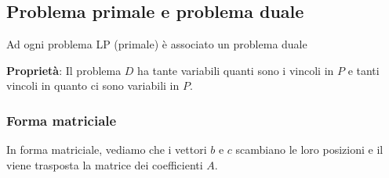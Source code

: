 \documentclass[12pt,a4paper]{article}
\begin{document}
\subsection{Problema primale e problema duale}
Ad ogni problema LP (primale) è associato un problema duale
\SmallSep \noindent
\begin{Parallel}{0.45 \textwidth}{0.45 \textwidth}
\end{Parallel}

\noindent
\textbf{Proprietà}: Il problema $D$ ha tante variabili quanti sono i vincoli in $P$ e tanti vincoli in quanto ci sono variabili in $P$.

\subsubsection{Forma matriciale}
In forma matriciale, vediamo che i vettori $b$ e $c$ scambiano le loro posizioni e il viene trasposta la matrice dei coefficienti $A$.

\SmallSep \noindent
\begin{Parallel}{0.45 \textwidth}{0.45 \textwidth}
\end{Parallel}
\end{document}
